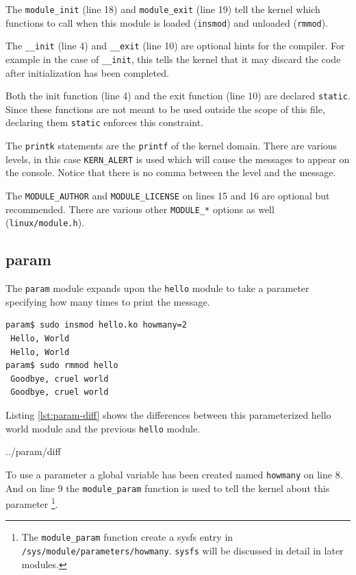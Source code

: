 \documentclass{article}
\begin{document}
The \verb+module_init+ (line 18) and \verb+module_exit+ (line 19) tell
the kernel which functions to call when this module is
loaded (\verb+insmod+) and unloaded (\verb+rmmod+).

The \verb+__init+ (line 4) and \verb+__exit+ (line 10)
are optional hints for the compiler.  For example in the case of
\verb+__init+, this tells the kernel that it may discard the code
after initialization has been completed.

Both the init function (line 4) and the exit function (line 10)
are declared \verb+static+.
Since these functions are not meant to be used outside the scope
of this file, declaring them \verb+static+ enforces this
constraint\autocite[Pg. 52]{corbet2009linux}.

The \verb+printk+ statements are the \verb+printf+ of the
kernel domain.  There are various levels, in this case
\verb+KERN_ALERT+ is used which will cause the messages
to appear on the console.  Notice that there is no comma
between the level and the message.

The \verb+MODULE_AUTHOR+ and \verb+MODULE_LICENSE+ on lines 15 and 16
are optional but recommended\autocite[Pg. 51]{corbet2009linux}.
There are various other \verb+MODULE_*+
options as well (\verb+linux/module.h+).

\subsection{param}

The \verb+param+ module expands upon the \verb+hello+ module to
take a parameter specifying how many times to print the message.

\begin{verbatim}
param$ sudo insmod hello.ko howmany=2
 Hello, World
 Hello, World
param$ sudo rmmod hello
 Goodbye, cruel world
 Goodbye, cruel world
\end{verbatim}

Listing \ref{lst:param-diff} shows the differences between this
parameterized hello world module and the previous \verb+hello+ module.


	{../param/diff}

To use a parameter a global variable has been created named \verb+howmany+
on line 8.
And on line 9 the \verb+module_param+ function is used to tell
the kernel about this parameter
\footnote{The \verb+module_param+ function create a sysfs entry
in \verb+/sys/module/parameters/howmany+.  \verb+sysfs+ will
be discussed in detail in later modules.}.
\end{document}

